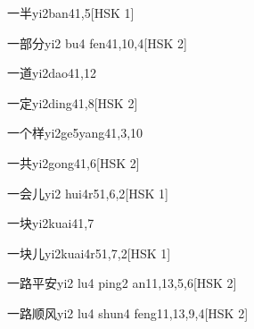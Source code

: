 \begin{entry}{一半}{yi2ban4}{1,5}[HSK 1]
\end{entry}

\begin{entry}{一部分}{yi2 bu4 fen4}{1,10,4}[HSK 2]
\end{entry}

\begin{entry}{一道}{yi2dao4}{1,12}
\end{entry}

\begin{entry}{一定}{yi2ding4}{1,8}[HSK 2]
\end{entry}

\begin{entry}{一个样}{yi2ge5yang4}{1,3,10}
\end{entry}

\begin{entry}{一共}{yi2gong4}{1,6}[HSK 2]
\end{entry}

\begin{entry}{一会儿}{yi2 hui4r5}{1,6,2}[HSK 1]
\end{entry}

\begin{entry}{一块}{yi2kuai4}{1,7}
\end{entry}

\begin{entry}{一块儿}{yi2kuai4r5}{1,7,2}[HSK 1]
\end{entry}

\begin{entry}{一路平安}{yi2 lu4 ping2 an1}{1,13,5,6}[HSK 2]
\end{entry}

\begin{entry}{一路顺风}{yi2 lu4 shun4 feng1}{1,13,9,4}[HSK 2]
\end{entry}

